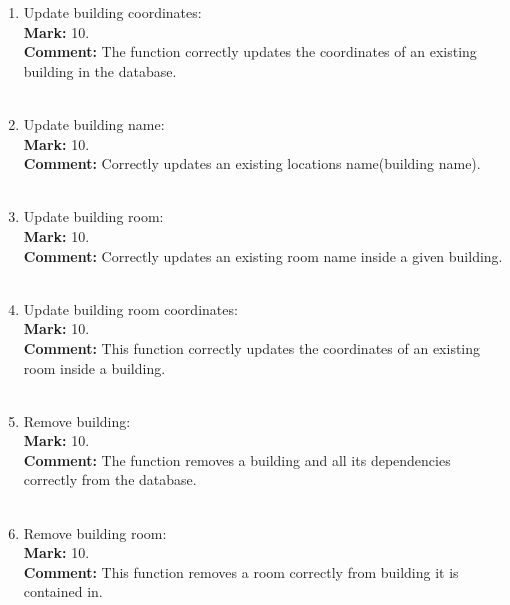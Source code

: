 \documentclass[12pt]{article}
\begin{document}
\begin{enumerate}
    \item Update building coordinates:\\
    \textbf{Mark: }
    10.\\
    \textbf{Comment:}
    The function correctly updates the coordinates of an existing building in the database.\\ \\
    
    \item Update building name:\\
    \textbf{Mark: }
    10.\\
    \textbf{Comment:}
    Correctly updates an existing locations name(building name).\\ \\
    
    \item Update building room:\\
    \textbf{Mark: }
    10.\\
    \textbf{Comment:}
    Correctly updates an existing room name inside a given building.\\ \\
    
    \item Update building room coordinates:\\
    \textbf{Mark: }
    10.\\
    \textbf{Comment:}
    This function correctly updates the coordinates of an existing room inside a building.\\ \\
    
    \item Remove building:\\
    \textbf{Mark: }
    10.\\
    \textbf{Comment:}
    The function removes a building and all its dependencies correctly from the database.\\ \\
    
    \item Remove building room:\\
    \textbf{Mark: }
    10.\\
    \textbf{Comment:}
    This function removes a room correctly from building it is contained in.\\ \\
\end{enumerate}
\end{document}
